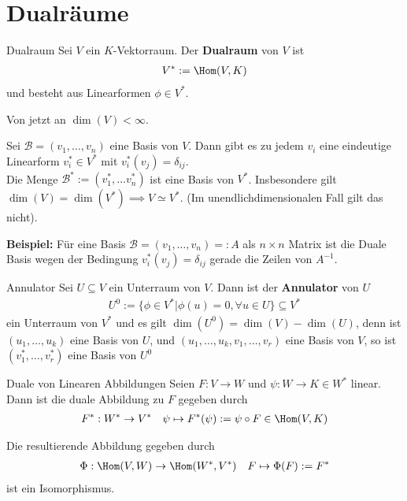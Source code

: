 \section{Dualräume}

\begin{definition}{Dualraum}
    Sei $V$ ein $K$-Vektorraum. Der \textbf{Dualraum} von $V$ ist
    \begin{align*}
        V^{*} := \Hom(V,K)
    \end{align*}
    und besteht aus Linearformen $\phi \in V^*$.
\end{definition}
Von jetzt an $\dim(V) < \infty$.

\begin{satz}{}
    Sei $\mathcal{B} = (v_{1}, \ldots, v_{n})$ eine Basis von $V$. Dann gibt es zu jedem $v_i$ eine eindeutige Linearform $v_i^{*} \in V^{*}$ mit $v_i^{*}(v_j) = \delta_{ij}$.\\
    Die Menge $\mathcal{B}^{*} := (v_1^{*}, \ldots v_n^{*})$ ist eine Basis von $V^{*}$. Insbesondere gilt $\dim(V) = \dim(V^*) \implies V \simeq V^{*}$. (Im unendlichdimensionalen Fall gilt das nicht).
\end{satz}
\textbf{Beispiel:} \quad Für eine Basis $\mathcal{B} = (v_1, \ldots, v_n ) =: A$ als $n \times n$ Matrix ist die Duale Basis wegen der Bedingung $v_i^{*}(v_j) = \delta_{ij}$ gerade die Zeilen von $A^{-1}$.\\

\begin{definition}{Annulator}
    Sei $U \subseteq V$ ein Unterraum von $V$. Dann ist der \textbf{Annulator} von $U$ 
    \begin{align*}
        U^0 := \{\phi \in V^* \big\vert \phi(u) = 0, \forall u \in U\} \subseteq V^*
    \end{align*}
    ein Unterraum von $V^*$ und es gilt $\dim(U^0) = \dim(V) - \dim(U)$, denn ist $(u_{1}, \ldots, u_{k})$ eine Basis von $U$, und $(u_{1}, \ldots, u_{k}, v_{1}, \ldots, v_{r})$ eine Basis von $V$, so ist $(v_{1}^*, \ldots, v_{r}^*)$ eine Basis von $U^0$
\end{definition}

\begin{definition}{Duale von Linearen Abbildungen}
    Seien $F: V \to W$ und $\psi: W \to K \in W^*$ linear. Dann ist die duale Abbildung zu $F$ gegeben durch
    \begin{align*}
        F^*: W^* \to V^* \quad \psi \mapsto F^{*}(\psi) := \psi \circ F \in \Hom(V, K)
    \end{align*}
    \begin{center}
    \end{center}
    Die resultierende Abbildung gegeben durch
    \begin{align*}
        \Phi: \Hom(V,W) \to \Hom(W^*, V^*) \quad F \mapsto \Phi(F) := F^* 
    \end{align*}
    ist ein Isomorphismus.
\end{definition}

